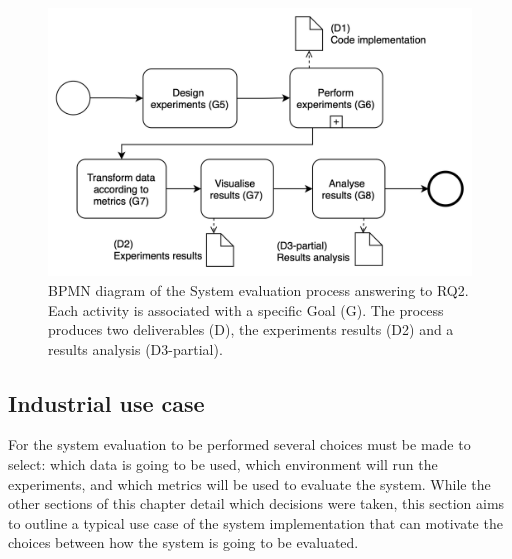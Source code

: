 \begin{figure}[!ht]
    \begin{center}
      \includegraphics[width=\textwidth]{figures/3-method/research_process_rq2.png}
    \caption[System evaluation process]{\gls{BPMN} diagram of the System evaluation process answering to RQ2. Each activity is associated with a specific Goal (\gls{G}). The process produces two deliverables (\gls{D}), the experiments results (D2) and a results analysis (D3-partial).}
    \label{fig:DevProcessRQ2}
    \end{center}
\end{figure}

\subsection{Industrial use case}
\label{subsec:use_case}

For the system evaluation to be performed several choices must be made to select: which data is going to be used, which environment will run the experiments, and which metrics will be used to evaluate the system. While the other sections of this chapter detail which decisions were taken, this section aims to outline a typical use case of the system implementation that can motivate the choices between how the system is going to be evaluated.

